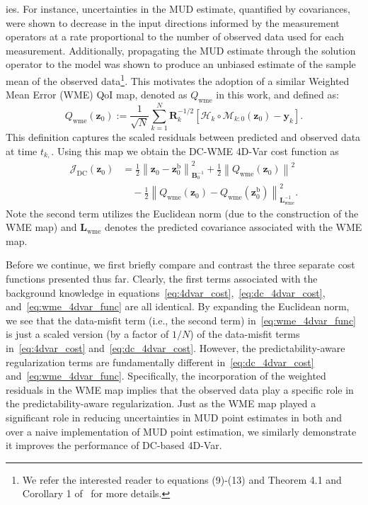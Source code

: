 \documentclass[final,1p,times]{elsarticle}
\begin{document}
ies.
For instance, uncertainties in the MUD estimate, quantified by covariances, were shown to decrease in the input directions informed by the measurement operators at a rate proportional to the number of observed data used for each measurement.
Additionally, propagating the MUD estimate through the solution operator to the model was shown to produce an unbiased estimate of the sample mean of the observed data\footnote{We refer the interested reader to equations (9)-(13) and Theorem 4.1 and Corollary 1 of~\cite{Pilosov2023} for more details.}.
This motivates the adoption of a similar Weighted Mean Error (WME) QoI map, denoted as $Q_{\mathrm{wme}}$ in this work, and defined as:
\begin{equation}
    Q_{\mathrm{wme}}\left(\mathbf{z}_0\right) := \frac{1}{\sqrt{N}} \sum_{k=1}^{N} \mathbf{R}_k^{-1/2}\left[\mathcal{H}_k \circ \mathcal{M}_{k:0}\left(\mathbf{z}_0\right)-\mathbf{y}_{k}\right].   \label{eq:wme_map}
\end{equation}
This definition captures the scaled residuals between predicted and observed data at time $t_{k,}$. Using this map we obtain the DC-WME 4D-Var cost function as
\begin{equation}
\begin{split}
    \mathcal{J}_{\mathrm{DC}}\left(\mathbf{z}_0\right) 
    &= \frac{1}{2}\left\|\mathbf{z}_0-\mathbf{z}_0^{\mathrm{b}}\right\|_{\mathbf{B}_0^{-1}}^2 
     + \frac{1}{2}\left\|Q_{\mathrm{wme}}\left(\mathbf{z}_0\right)\right\|^2 \\
    &\quad - \frac{1}{2}\left\|Q_{\mathrm{wme}}\left(\mathbf{z}_0\right) 
        - Q_{\mathrm{wme}}\left(\mathbf{z}_0^{\mathrm{b}}\right)\right\|_{\mathbf{L}_\mathrm{wme}^{-1}}^2 .     \label{eq:wme_4dvar_func}
\end{split}
\end{equation}
Note the second term utilizes the Euclidean norm (due to the construction of the WME map) and $\mathbf{L}_\mathrm{wme}$ denotes the predicted covariance associated with the WME map.

Before we continue, we first briefly compare and contrast the three separate cost functions presented thus far. 
Clearly, the first terms associated with the background knowledge in equations~\eqref{eq:4dvar_cost},~\eqref{eq:dc_4dvar_cost}, and~\eqref{eq:wme_4dvar_func} are all identical. 
By expanding the Euclidean norm, we see that the data-misfit term (i.e., the second term) in~\eqref{eq:wme_4dvar_func} is just a scaled version (by a factor of $1/N$) of the data-misfit terms in~\eqref{eq:4dvar_cost} and~\eqref{eq:dc_4dvar_cost}.
However, the predictability-aware regularization terms are fundamentally different in~\eqref{eq:dc_4dvar_cost} and~\eqref{eq:wme_4dvar_func}.
Specifically, the incorporation of the weighted residuals in the WME map implies that the observed data play a specific role in the predictability-aware regularization.
Just as the WME map played a significant role in reducing uncertainties in MUD point estimates in both \cite{Pilosov2023} and \cite{del-Castillo-Negrete2024} over a naive implementation of MUD point estimation, we similarly demonstrate it improves the performance of DC-based 4D-Var. 
\end{document}
